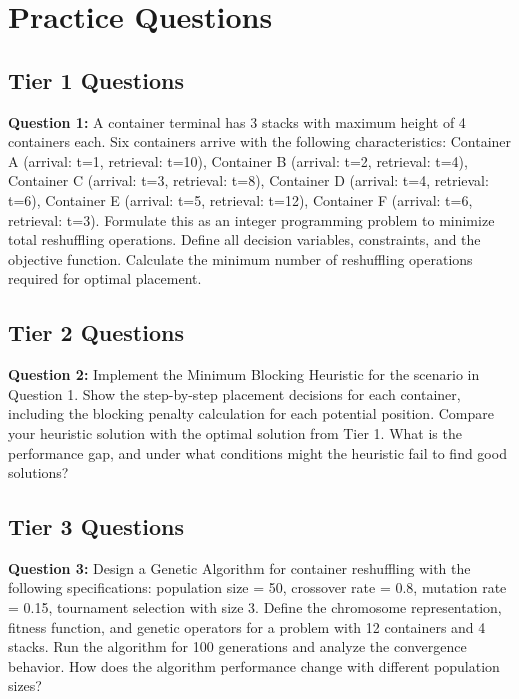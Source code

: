 \documentclass{article}
\begin{document}
\section{Practice Questions}

\subsection{Tier 1 Questions}

\textbf{Question 1:} A container terminal has 3 stacks with maximum height of 4 containers each. Six containers arrive with the following characteristics: Container A (arrival: t=1, retrieval: t=10), Container B (arrival: t=2, retrieval: t=4), Container C (arrival: t=3, retrieval: t=8), Container D (arrival: t=4, retrieval: t=6), Container E (arrival: t=5, retrieval: t=12), Container F (arrival: t=6, retrieval: t=3). Formulate this as an integer programming problem to minimize total reshuffling operations. Define all decision variables, constraints, and the objective function. Calculate the minimum number of reshuffling operations required for optimal placement.

\subsection{Tier 2 Questions}

\textbf{Question 2:} Implement the Minimum Blocking Heuristic for the scenario in Question 1. Show the step-by-step placement decisions for each container, including the blocking penalty calculation for each potential position. Compare your heuristic solution with the optimal solution from Tier 1. What is the performance gap, and under what conditions might the heuristic fail to find good solutions?

\subsection{Tier 3 Questions}

\textbf{Question 3:} Design a Genetic Algorithm for container reshuffling with the following specifications: population size = 50, crossover rate = 0.8, mutation rate = 0.15, tournament selection with size 3. Define the chromosome representation, fitness function, and genetic operators for a problem with 12 containers and 4 stacks. Run the algorithm for 100 generations and analyze the convergence behavior. How does the algorithm performance change with different population sizes?
\end{document}
